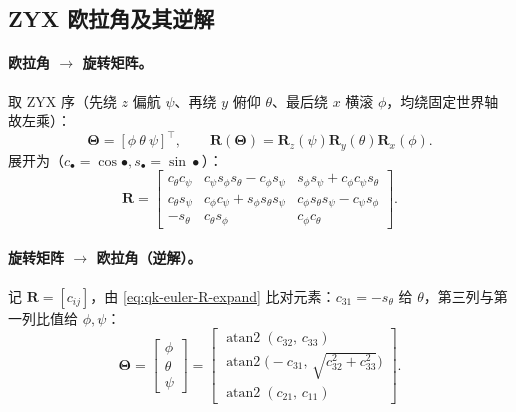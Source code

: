 \subsection{ZYX 欧拉角及其逆解}
\label{subsec:qk-euler}

\paragraph{欧拉角 $\to$ 旋转矩阵。}
取 ZYX 序（先绕 $z$ 偏航 $\psi$、再绕 $y$ 俯仰 $\theta$、最后绕 $x$ 横滚 $\phi$，均绕固定世界轴故左乘）\cite{yu2021quadruped}：
\begin{equation}
  \boldsymbol{\Theta}=[\phi\ \theta\ \psi]^\top,\qquad
  \mathbf{R}(\boldsymbol{\Theta})=\mathbf{R}_z(\psi)\mathbf{R}_y(\theta)\mathbf{R}_x(\phi).
  \label{eq:qk-euler-to-R}
\end{equation}
展开为（$c_\bullet=\cos\bullet,s_\bullet=\sin\bullet$）\cite{yu2021quadruped}：
\begin{equation}
  \mathbf{R}=\begin{bmatrix}
    c_\theta c_\psi & c_\psi s_\phi s_\theta-c_\phi s_\psi & s_\phi s_\psi+c_\phi c_\psi s_\theta\\
    c_\theta s_\psi & c_\phi c_\psi+s_\phi s_\theta s_\psi & c_\phi s_\theta s_\psi-c_\psi s_\phi\\
    -s_\theta & c_\theta s_\phi & c_\phi c_\theta
  \end{bmatrix}.
  \label{eq:qk-euler-R-expand}
\end{equation}

\paragraph{旋转矩阵 $\to$ 欧拉角（逆解）。}
记 $\mathbf{R}=[c_{ij}]$，由 \cref{eq:qk-euler-R-expand} 比对元素：$c_{31}=-s_\theta$ 给 $\theta$，第三列与第一列比值给 $\phi,\psi$\cite{yu2021quadruped}：
\begin{equation}
  \boldsymbol{\Theta}=\begin{bmatrix}\phi\\\theta\\\psi\end{bmatrix}
  =\begin{bmatrix}
    \operatorname{atan2}(c_{32},\,c_{33})\\[2pt]
    \operatorname{atan2}\!\big(-c_{31},\,\sqrt{c_{32}^2+c_{33}^2}\big)\\[2pt]
    \operatorname{atan2}(c_{21},\,c_{11})
  \end{bmatrix}.
  \label{eq:qk-R-to-euler}
\end{equation}

